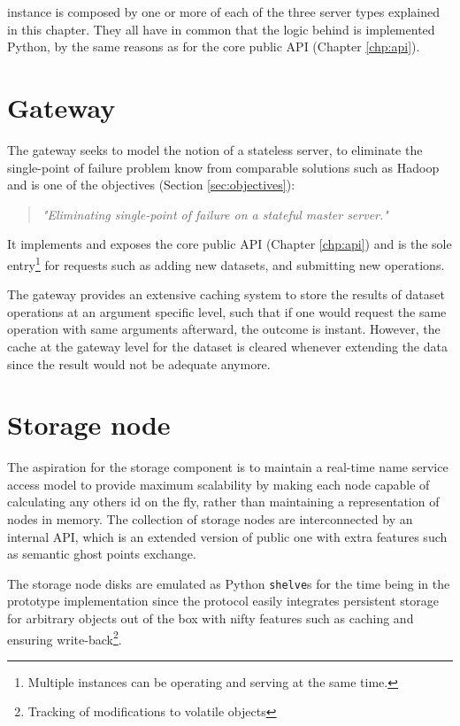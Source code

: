  \CodeName instance is composed by one or more of each of the three server types explained in this chapter. They all have in common that the logic behind is implemented Python, by the same reasons as for the core public API (Chapter \ref{chp:api}).

\section{Gateway} \label{sec:gateway}
The \CodeName gateway seeks to model the notion of a stateless server, to eliminate the single-point of failure problem know from comparable solutions such as Hadoop and is one of the objectives (Section \ref{sec:objectives}):
\begin{quotation}
	\textit{"Eliminating single-point of failure on a stateful master server."}
\end{quotation}

It implements and exposes the core public API (Chapter \ref{chp:api}) and is the sole entry\footnote{Multiple instances can be operating and serving at the same time.} for requests such as adding new datasets, and submitting new operations.
\newline

The gateway provides an extensive caching system to store the results of dataset operations at an argument specific level, such that if one would request the same operation with same arguments afterward, the outcome is instant. However, the cache at the gateway level for the dataset is cleared whenever extending the data since the result would not be adequate anymore.

\section{Storage node} \label{sec:storage}
The aspiration for the storage component is to maintain a real-time name service access model to provide maximum scalability by making each node capable of calculating any others id on the fly, rather than maintaining a representation of nodes in memory. The collection of storage nodes are interconnected by an internal API, which is an extended version of public one with extra features such as semantic ghost points exchange.
\newline

The storage node disks are emulated as Python \texttt{shelve}s \cite{PageShelve} for the time being in the prototype implementation since the protocol easily integrates persistent storage for arbitrary objects out of the box with nifty features such as caching and ensuring write-back\footnote{Tracking of modifications to volatile objects}.

